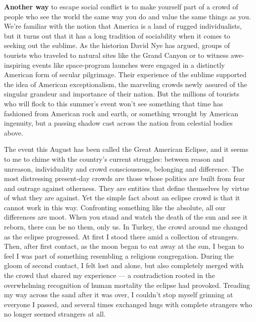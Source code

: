 \textbf{Another way} to escape social conflict is to make yourself part
of a crowd of people who see the world the same way you do and value the
same things as you. We're familiar with the notion that America is a
land of rugged individualists, but it turns out that it has a long
tradition of sociability when it comes to seeking out the sublime. As
the historian David Nye has argued, groups of tourists who traveled to
natural sites like the Grand Canyon or to witness awe-inspiring events
like space-program launches were engaged in a distinctly American form
of secular pilgrimage. Their experience of the sublime supported the
idea of American exceptionalism, the marveling crowds newly assured of
the singular grandeur and importance of their nation. But the millions
of tourists who will flock to this summer's event won't see something
that time has fashioned from American rock and earth, or something
wrought by American ingenuity, but a passing shadow cast across the
nation from celestial bodies above.

The event this August has been called the Great American Eclipse, and it
seems to me to chime with the country's current struggles: between
reason and unreason, individuality and crowd consciousness, belonging
and difference. The most distressing present-day crowds are those whose
politics are built from fear and outrage against otherness. They are
entities that define themselves by virtue of what they are against. Yet
the simple fact about an eclipse crowd is that it cannot work in this
way. Confronting something like the absolute, all our differences are
moot. When you stand and watch the death of the sun and see it reborn,
there can be no them, only us. In Turkey, the crowd around me changed as
the eclipse progressed. At first I stood there amid a collection of
strangers. Then, after first contact, as the moon began to eat away at
the sun, I began to feel I was part of something resembling a religious
congregation. During the gloom of second contact, I felt lost and alone,
but also completely merged with the crowd that shared my experience ---
a contradiction rooted in the overwhelming recognition of human
mortality the eclipse had provoked. Treading my way across the sand
after it was over, I couldn't stop myself grinning at everyone I passed,
and several times exchanged hugs with complete strangers who no longer
seemed strangers at all.

